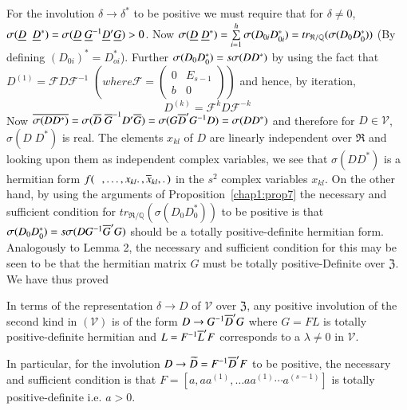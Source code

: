 For the involution $\delta \rightarrow \delta^{\ast}$ to be positive
we must require that for $\delta \neq 0$, $\sigma (\underline{D}\;\;
\underline{D}^{\ast}) = \sigma (\underline{D}\;\underline{G}^{-1} \underline{D}' \underline{G})>0$. Now 
$\sigma (\underline{D} \; \underline{D}^{\ast}) = \sum\limits^h_{i=1} \sigma (D_{0i}
D^{\ast}_{0i}) = tr_{\mathfrak{R}/\mathbb{Q}} (\sigma (D_0
D^{\ast}_0))$ (By defining $(D_{0i})^{\ast} = D^{\ast}_{oi}$). Further
$\sigma (D_0 D^{\ast}_0) =\break s\sigma (D D^{\ast})$ by using the fact
that $D^{(1)} = \mathscr{F} D \mathscr{F}^{-1}$ $\left(where \mathscr{F} =
\left(\begin{smallmatrix} 0 & E_{s-1}\\ b &
  0\end{smallmatrix}\right)\right)$ and hence, by iteration,
\begin{equation*}
D^{(k)} = \mathscr{F}^k D \mathscr{F}^{-k} \tag{51}\label{eq51}
\end{equation*}\pageoriginale
Now $\overline{\sigma(D D^{\ast})} = \sigma (\overline{D}\; \overline{G}^{-1} D' \overline{G})
= \sigma(G \overline{D}'G^{-1}D) = \sigma (D D^{\ast})$ and therefore for
$D\in\mathscr{V}$, $\sigma(D \; D^{\ast})$ is real. The elements
$x_{kl}$ of $D$ are linearly independent over $\mathfrak{R}$ and
looking upon them as independent complex variables, we see that
$\sigma(D D^{\ast})$ is a hermitian form $f({\phantom{w}},\ldots,
x_{kl}\ldotp, \overline{x}_{kl},\ldotp)$ in the $s^2$ complex variables
$x_{kl}$. On the other hand, by using the arguments of 
Proposition~\ref{chap1:prop7} the necessary and sufficient condition for
$tr_{\mathfrak{R}/\mathbb{Q}}(\sigma(D_0 D^{\ast}_0))$ to be positive
is that $\sigma (D_0 D^{\ast}_0) = s\sigma(D G^{-1} \overline{G}' G)$ should
be a totally positive-definite hermitian form. Analogously to Lemma 2,
the necessary and sufficient condition for this may be seen to be that
the hermitian matrix $G$ must be totally positive-Definite over
$\mathfrak{Z}$. We have thus proved

\begin{proposition}
In terms of the representation $\delta \rightarrow D$ of $\mathscr{V}$
over $\mathfrak{Z}$, any positive involution of the second kind in
$(\mathscr{V})$ is of the form $D\rightarrow G^{-1} \overline{D}'G$ where $G
= FL$ is totally positive-definite hermitian and $L=F^{-1}\overline{L}'F$
corresponds to a $\lambda \neq 0$ in $\mathscr{V}$.
\end{proposition}

In particular, for the involution $D \rightarrow \widetilde{D} =
F^{-1} \overline{D}'F$ to be positive, the necessary and sufficient
condition is that $F=[a,a a^{(1)},\ldots a a^{(1)}\cdots a^{(s-1)}]$
is totally positive-definite i.e. $a>0$.

